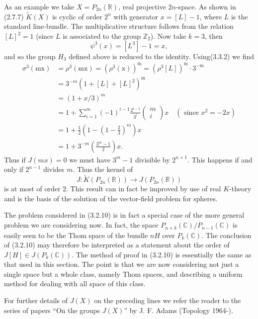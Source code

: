 \documentclass[leqno]{book}
\numberwithin{equation}{section}
\theoremstyle{definition}
\begin{document}
            As an example we take $X=P_{2n}(\mathbb{R})$, real projective $2n$-space. As shown in (2.7.7) $\tilde{K}(X)$ is cyclic of order $2^{n}$ with generator $x=[L]-1$, where $L$ is the standard line-bundle. The multiplicative structure follows from the relation $[L]^{2}=1$ (since $L$ is associated to the group $\mathbb{Z}_{2}$). Now take $k=3$, then
            \begin{equation*}
              \psi^{3}(x)=[L^{3}]-1=x,
            \end{equation*}
            and so the group $H_3$ defined above is reduced to the identity. Using(3.3.2) we find
            \begin{equation*}
              \begin{aligned}
                \sigma^3(\mathrm{mx}) & =\rho^3(\mathrm{mx})=\left(\rho^3(\mathrm{x})\right)^{\mathrm{m}}=\left(\rho^3[L]\right)^{\mathrm{m}} \cdot 3^{-\mathrm{m}} \\
                & =3^{-m}\left(1+[L]+[L]^2\right)^{\mathrm{m}} \\
                & =(1+x / 3)^m \\
                & =1+\sum_{i=1}^m(-1)^{i-1} \frac{2^{i-1}}{3^i}\left(\begin{array}{c}
                m \\
                i
                \end{array}\right) x \quad\left(\text { since } x^2=-2 x\right) \\
                & =1+\frac{1}{2}\left(1-\left(1-\frac{2}{3}\right)^m\right) x \\
                & =1+3^{-m}\left(\frac{3^m-1}{2}\right) x.
                \end{aligned}
            \end{equation*}
            Thus if $J(mx)=0$ we must have $3^{m}-1$ divisible by $2^{n+1}$. This happens if and only if $2^{n-1}$ divides $m$. Thus the kernel of
            \begin{equation*}
              J:\tilde{K}(P_{2n}(\mathbb{R}))\to J(P_{2n}(\mathbb{R}))
            \end{equation*}
            is at most of order $2$. This result can in fact be improved by use of real $K$-theory and is the basis of the solution of the vector-field problem for spheres.

            The problem considered in (3.2.10) is in fact a special case of the more general problem we are considering now. In fact, the space $P_{n+k}(\mathbb{C})/P_{n-1}(\mathbb{C})$ is easily seen to be the Thom space of the bundle $nH$ over $P_{k}(\mathbb{C})$. The conclusion of (3.2.10) may therefore be interpreted as a statement about the order of $J[H]\in J(P_{k}(\mathbb{C}))$. The method of proof in (3.2.10) is essentially the same as that used in this section. The point is that we are now considering not just a single space but a whole class, namely Thom spaces, and describing a uniform method for dealing with all space of this class.

            For further details of $J(X)$ on the preceding lines we refer the reader to the series of papers ``On the groups $J(X)$'' by J. F. Adams (Topology 1964-).

    
    
\end{document}
